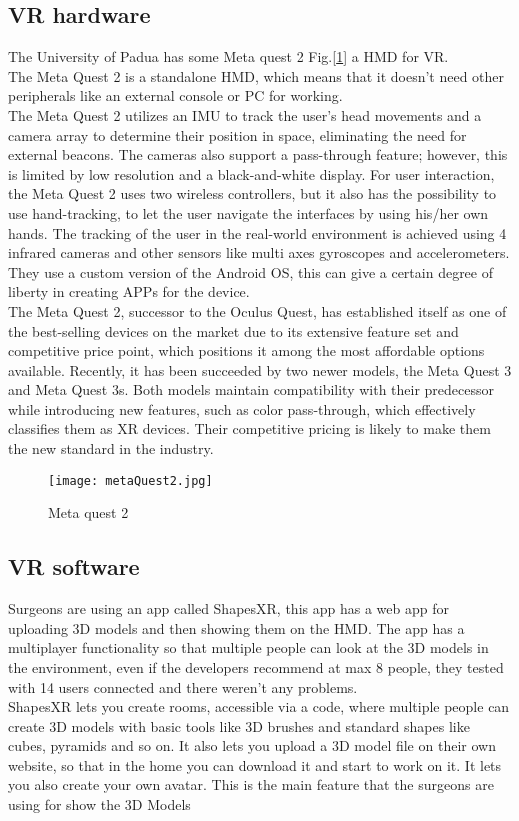 \subsection{VR hardware}
\noindent
The University of Padua has some Meta quest 2 Fig.[\ref{fig:metaQuest2}] a \ac{HMD} for \ac{VR}.\\ 
The Meta Quest 2 is a standalone \ac{HMD}, which means that it doesn't need other peripherals like an external console or \ac{PC} for working.\\
The Meta Quest 2 utilizes an \ac{IMU} to track the user's head movements and a camera array to determine their position in space, eliminating the need for external beacons.
The cameras also support a pass-through feature; however, this is limited by low resolution and a black-and-white display.
For user interaction, the Meta Quest 2 uses two wireless controllers, but it also has the possibility to use hand-tracking, to let the user navigate the interfaces by using his/her own hands.
The tracking of the user in the real-world environment is achieved using 4 infrared cameras and other sensors like multi axes gyroscopes and accelerometers.\\
They use a custom version of the Android \ac{OS}, this can give a certain degree of liberty in creating APPs for the device.\\
The Meta Quest 2, successor to the Oculus Quest, has established itself as one of the best-selling devices on the market due to its extensive feature set and competitive price point, which positions it among the most affordable options available.
Recently, it has been succeeded by two newer models, the Meta Quest 3 and Meta Quest 3s.
Both models maintain compatibility with their predecessor while introducing new features, such as color pass-through, which effectively classifies them as \ac{XR} devices.
Their competitive pricing is likely to make them the new standard in the industry.


\begin{figure}[ht]
  \centering
  \texttt{[image: metaQuest2.jpg]}
  \caption{Meta quest 2}
  \label{fig:metaQuest2}
\end{figure}


\subsection{VR software}
\noindent
Surgeons are using an app called ShapesXR, this app has a web app for uploading 3D models and then showing them on the \ac{HMD}.
The app has a multiplayer functionality so that multiple people can look at the 3D models in the environment, even if the developers recommend at max 8 people, they tested with 14 users connected and there weren't any problems.\\
ShapesXR lets you create rooms, accessible via a code, where multiple people can create 3D models with basic tools like 3D brushes and standard shapes like cubes, pyramids and so on.
It also lets you upload a 3D model file on their own website, so that in the home you can download it and start to work on it.
It lets you also create your own avatar.
This is the main feature that the surgeons are using for show the 3D Models

